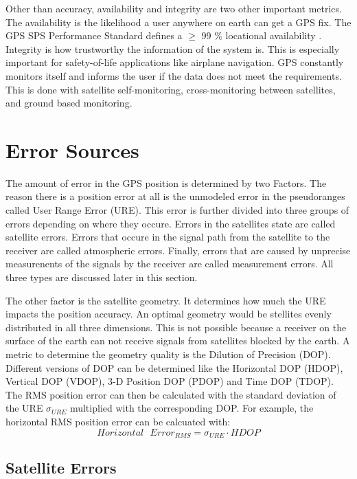 Other than accuracy, availability and integrity are two other important metrics.
The availability is the likelihood a user anywhere on earth can get a GPS fix.
The GPS SPS Performance Standard defines a $\geq$ 99 \% locational availability \cite{SPS_Performance}.
Integrity is how trustworthy the information of the system is.
This is especially important for safety-of-life applications like airplane navigation.
GPS constantly monitors itself and informs the user if the data does not meet the requirements.
This is done with satellite self-monitoring, cross-monitoring between satellites, and ground based monitoring. \cite{misra2011global}


\section{Error Sources}\label{sec:error_sources}

The amount of error in the GPS position is determined by two Factors.
The reason there is a position error at all is the unmodeled error in the pseudoranges called User Range Error (URE).
This error is further divided into three groups of errors depending on where they occure.
Errors in the satellites state are called satellite errors.
Errors that occure in the signal path from the satellite to the receiver are called atmospheric errors.
Finally, errors that are caused by unprecise measurenents of the signals by the receiver are called measurement errors.
All three types are discussed later in this section.

The other factor is the satellite geometry.
It determines how much the URE impacts the position accuracy.
An optimal geometry would be stellites evenly distributed in all three dimensions.
This is not possible because a receiver on the surface of the earth can not receive signals from satellites blocked by the earth.
A metric to determine the geometry quality is the Dilution of Precision (DOP).
Different versions of DOP can be determined like the Horizontal DOP (HDOP), Vertical DOP (VDOP), 3-D Position DOP (PDOP) and Time DOP (TDOP).
The RMS position error can then be calculated with the standard deviation of the URE $\sigma_{URE}$ multiplied with the corresponding DOP.
For example, the horizontal RMS position error can be calcuated with:
\begin{equation}
 Horizontal \text{ } Error_{RMS} = \sigma_{URE} \cdot HDOP
\end{equation}

\subsection{Satellite Errors}


